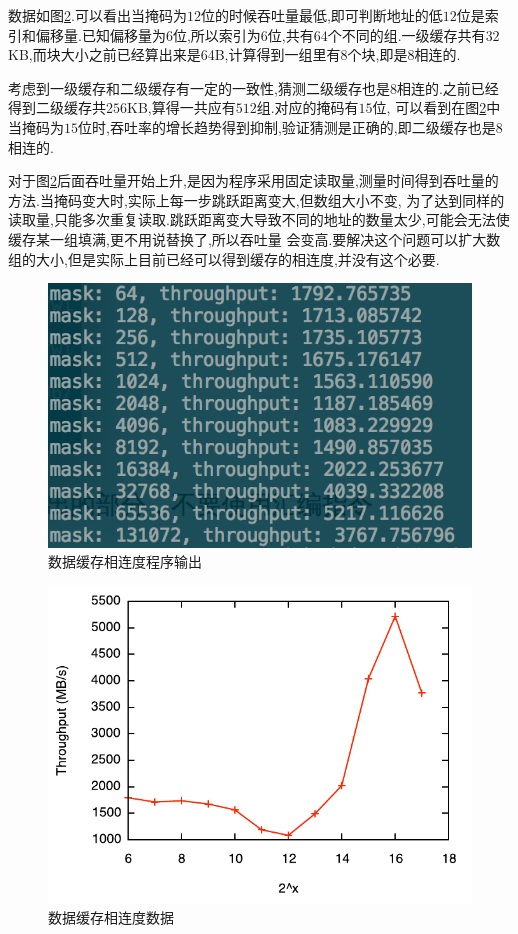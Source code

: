 \documentclass[adobefonts, nocap]{ctexart}
\begin{document}
      数据如图\ref{fig6}.可以看出当掩码为$12$位的时候吞吐量最低,即可判断地址的低$12$位是索引和偏移量.已知偏移量为$6$位,所以索引为$6$位,共有$64$个不同的组.一级缓存共有$32$KB,而块大小之前已经算出来是64B,计算得到一组里有$8$个块,即是$8$相连的.

      考虑到一级缓存和二级缓存有一定的一致性,猜测二级缓存也是$8$相连的.之前已经得到二级缓存共$256$KB,算得一共应有$512$组.对应的掩码有$15$位,
      可以看到在图\ref{fig6}中当掩码为$15$位时,吞吐率的增长趋势得到抑制,验证猜测是正确的,即二级缓存也是$8$相连的.

      对于图\ref{fig6}后面吞吐量开始上升,是因为程序采用固定读取量,测量时间得到吞吐量的方法.当掩码变大时,实际上每一步跳跃距离变大,但数组大小不变,
      为了达到同样的读取量,只能多次重复读取.跳跃距离变大导致不同的地址的数量太少,可能会无法使缓存某一组填满,更不用说替换了,所以吞吐量
      会变高.要解决这个问题可以扩大数组的大小,但是实际上目前已经可以得到缓存的相连度,并没有这个必要.

      \begin{figure}[htbp]
        \includegraphics[width=12cm]{5.png}
        \caption{数据缓存相连度程序输出}
        \label{fig5}
      \end{figure}

      \begin{figure}[htbp]
        \includegraphics[width=12cm]{6.pdf}
        \caption{数据缓存相连度数据}
        \label{fig6}
      \end{figure}
      \clearpage
\end{document}
